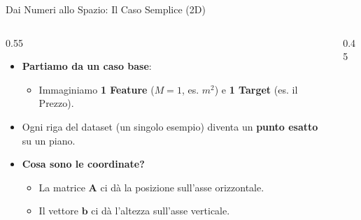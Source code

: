 \documentclass[aspectratio=169, 10pt]{beamer}
\begin{document}
\begin{frame}{Dai Numeri allo Spazio: Il Caso Semplice (2D)}
\begin{columns}[T]
    \begin{column}{0.55\textwidth}
        \small %
        \begin{itemize}
            \setlength\itemsep{0.8em} %
            \item \textbf{Partiamo da un caso base}:
            \begin{itemize}
                \item Immaginiamo \textbf{1 Feature} ($M=1$, es. $m^2$) e \textbf{1 Target} (es. il Prezzo).
            \end{itemize}
            \item Ogni riga del dataset (un singolo esempio) diventa un \textbf{punto esatto} su un piano.
            \item \textbf{Cosa sono le coordinate?}
            \begin{itemize}
                \item La matrice $\mathbf{A}$ ci dà la posizione sull'asse orizzontale.
                \item Il vettore $\mathbf{b}$ ci dà l'altezza sull'asse verticale.
            \end{itemize}
        \end{itemize}
    \end{column}
    
    \begin{column}{0.45\textwidth}
        \centering
\end{column}
\end{columns}
\end{frame}
\end{document}
